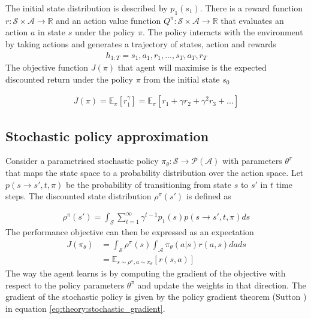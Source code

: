 \documentclass[class=book, crop=false, 11pt]{standalone}
\begin{document}
The initial state distribution is described by $p_{1}(s_{1})$. There is a reward function $r: \mathcal{S} \times \mathcal{A} \to \mathbb{R}$ and an action value function $Q^{\pi}:\mathcal{S} \times \mathcal{A} \to \mathbb{R}$ that evaluates an action $a$ in state $s$ under the policy $\pi$. The policy interacts with the environment by taking actions and generates a trajectory of states, action and rewards 
\begin{equation}
   \begin{aligned}\label{eq:theory:trajectory2}
h_{1:T} = s_{1},a_{1},r_{1},..., s_{T},a_{T},r_{T}
\end{aligned} 
\end{equation}
The objective function $J(\pi)$ that agent will maximise is the expected discounted return under the policy $\pi$ from the initial state $s_{0}$

\begin{equation}
   \begin{aligned}\label{eq:theory:max_discounted_return}
J(\pi)
= \mathbb{E}_{\pi}[r^{\gamma}_{1}]
= \mathbb{E}_{\pi}[ r_{1} + \gamma r_{2} + \gamma^{2} r_{3} + ...]
\end{aligned} 
\end{equation}

\subsection{Stochastic policy approximation}\label{section:stochastic_policy_approx}
Consider a parametrised stochastic policy $\pi_{\theta}: \mathcal{S}\to \mathcal{P}(\mathcal{A})$ with parameters $\theta^{\pi}$ that maps the state space to a probability distribution over the action space. Let $p(s\to s',t,\pi)$ be the probability of transitioning from state $s$ to $s'$ in $t$ time steps. The discounted state distribution $\rho^{\pi}(s')$ is defined as   

\begin{equation}
   \begin{aligned}\label{eq:theory:discounted_state_distribution}
    \rho^{\pi}(s') = \int_{\mathcal{S}}\sum_{t=1}^{\infty }\gamma^{t-1}p_{1}(s)
    p(s \to s',t,\pi)ds
\end{aligned} 
\end{equation}
The performance objective can then be expressed as an expectation
\begin{equation}
   \begin{aligned}\label{eq:theory:objective_expected_stochastic}
    J(\pi_{\theta}) &= 
    \int_{\mathcal{S}}\rho^{\pi}(s) \int_{\mathcal{A}}\pi_{\theta}(a|s)r(a,s)da ds 
    \\
    &=
    \mathbb{E}_{s\sim \rho^{\pi},a \sim \pi_{\theta}}[r(s,a)]
\end{aligned} 
\end{equation}
 The way the agent learns is by computing the gradient of the objective with respect to the policy parameters $\theta^{\pi}$ and update the weights in that direction. The gradient of the stochastic policy is given by the policy gradient theorem (Sutton \cite{Sutton1998}) in equation \eqref{eq:theory:stochastic_gradient}.
\end{document}
